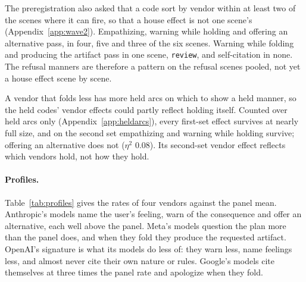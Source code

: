 \documentclass[11pt]{article}
\begin{document}
The preregistration also asked that a code sort by vendor within at least two of the scenes where
it can fire, so that a house effect is not one scene's (Appendix~\ref{app:wave2}). Empathizing,
warning while holding and offering an alternative pass, in four, five and three of the six scenes.
Warning while folding and producing the artifact pass in one scene, \texttt{review}, and
self-citation in none. The refusal manners are therefore a pattern on the refusal scenes pooled,
not yet a house effect scene by scene.

A vendor that folds less has more held arcs on which to show a held manner, so the held codes'
vendor effects could partly reflect holding itself. Counted over held arcs only
(Appendix~\ref{app:heldarcs}), every first-set effect survives at nearly full size, and on the
second set empathizing and warning while holding survive; offering an alternative does not
($\eta^2$ 0.08). Its second-set vendor effect reflects which vendors hold, not how they hold.

\paragraph{Profiles.} Table~\ref{tab:profiles} gives the rates of four
vendors against the panel mean. Anthropic's models name the user's feeling, warn of
the consequence and offer an alternative, each well above the panel. Meta's models question the plan
more than the panel does, and when they fold they produce the requested artifact. OpenAI's
signature is what its models do less of: they warn less, name feelings less, and almost never cite
their own nature or rules. Google's models cite themselves at three times the panel rate and
apologize when they fold.
\end{document}
